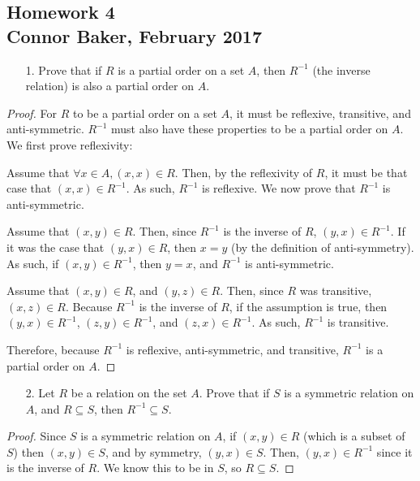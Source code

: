 \documentclass[10pt]{article}
\theoremstyle{definition}
\theoremstyle{plain}
\begin{document}
\begin{center}
  \subsection*{Homework 4\\Connor Baker, February 2017}
\end{center}

\begin{enumerate}
\item[1.] Prove that if $R$ is a partial order on a set $A$, then $R^{-1}$ (the inverse relation) is also a partial order on $A$.
\end{enumerate}

\begin{proof}
  For $R$ to be a partial order on a set $A$, it must be reflexive, transitive, and anti-symmetric. $R^{-1}$ must also have these properties to be a partial order on $A$. We first prove reflexivity:

  Assume that $\forall x\in A, (x,x)\in R$. Then, by the reflexivity of $R$, it must be that case that $(x,x)\in R^{-1}$. As such, $R^{-1}$ is reflexive. We now prove that $R^{-1}$ is anti-symmetric.

  Assume that $(x,y)\in R$. Then, since $R^{-1}$ is the inverse of $R$, $(y,x)\in R^{-1}$. If it was the case that $(y,x)\in R$, then $x=y$ (by the definition of anti-symmetry). As such, if $(x,y)\in R^{-1}$, then $y=x$, and $R^{-1}$ is anti-symmetric.

  Assume that $(x,y)\in R$, and $(y,z)\in R$. Then, since $R$ was transitive, $(x,z)\in R$. Because $R^{-1}$ is the inverse of $R$, if the assumption is true, then $(y,x)\in R^{-1}$, $(z,y)\in R^{-1}$, and $(z,x)\in R^{-1}$. As such, $R^{-1}$ is transitive.

  Therefore, because $R^{-1}$ is reflexive, anti-symmetric, and transitive, $R^{-1}$ is a partial order on $A$.
\end{proof}



\pagebreak



\begin{enumerate}
  \item[2.] Let $R$ be a relation on the set $A$.  Prove that if $S$ is a symmetric relation on $A$, and $R \subseteq S$, then $R^{-1} \subseteq S$.
\end{enumerate}

\begin{proof}
  Since $S$ is a symmetric relation on $A$, if $(x,y)\in R$ (which is a subset of $S$) then $(x,y)\in S$, and by symmetry, $(y,x)\in S$. Then, $(y,x)\in R^{-1}$ since it is the inverse of $R$. We know this to be in $S$, so $R \subseteq S$.
\end{proof}
\end{document}
